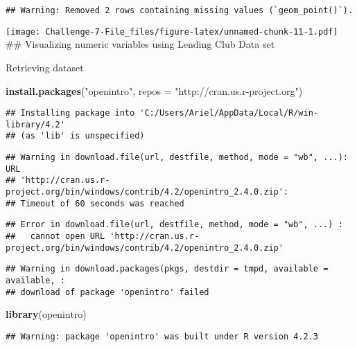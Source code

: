 \documentclass[
]{article}
\newenvironment{Shaded}{\begin{snugshade}}{\end{snugshade}}
\newcommand{\AttributeTok}[1]{\textcolor[rgb]{0.13,0.29,0.53}{#1}}
\newcommand{\FunctionTok}[1]{\textcolor[rgb]{0.13,0.29,0.53}{\textbf{#1}}}
\newcommand{\NormalTok}[1]{#1}
\newcommand{\StringTok}[1]{\textcolor[rgb]{0.31,0.60,0.02}{#1}}
\begin{document}
\begin{verbatim}
## Warning: Removed 2 rows containing missing values (`geom_point()`).
\end{verbatim}

\texttt{[image: Challenge-7-File\_files/figure-latex/unnamed-chunk-11-1.pdf]}
\#\# Visualizing numeric variables using Lending Club Data set

Retrieving dataset

\begin{Shaded}
\begin{Highlighting}[]
\FunctionTok{install.packages}\NormalTok{(}\StringTok{"openintro"}\NormalTok{, }\AttributeTok{repos =} \StringTok{"http://cran.us.r{-}project.org"}\NormalTok{)}
\end{Highlighting}
\end{Shaded}

\begin{verbatim}
## Installing package into 'C:/Users/Ariel/AppData/Local/R/win-library/4.2'
## (as 'lib' is unspecified)
\end{verbatim}

\begin{verbatim}
## Warning in download.file(url, destfile, method, mode = "wb", ...): URL
## 'http://cran.us.r-project.org/bin/windows/contrib/4.2/openintro_2.4.0.zip':
## Timeout of 60 seconds was reached
\end{verbatim}

\begin{verbatim}
## Error in download.file(url, destfile, method, mode = "wb", ...) : 
##   cannot open URL 'http://cran.us.r-project.org/bin/windows/contrib/4.2/openintro_2.4.0.zip'
\end{verbatim}

\begin{verbatim}
## Warning in download.packages(pkgs, destdir = tmpd, available = available, :
## download of package 'openintro' failed
\end{verbatim}

\begin{Shaded}
\begin{Highlighting}[]
\FunctionTok{library}\NormalTok{(openintro)}
\end{Highlighting}
\end{Shaded}

\begin{verbatim}
## Warning: package 'openintro' was built under R version 4.2.3
\end{verbatim}
\end{document}

